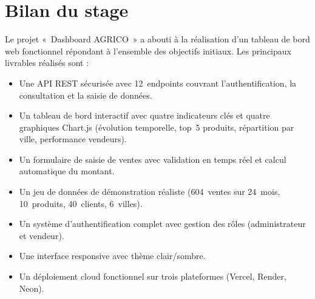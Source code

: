 \documentclass[11pt,a4paper]{report}
\begin{document}
\section{Bilan du stage}
Le projet «~Dashboard AGRICO~» a abouti à la réalisation d'un tableau de bord web
fonctionnel répondant à l'ensemble des objectifs initiaux. Les principaux
livrables réalisés sont :
\begin{itemize}
  \item Une API REST sécurisée avec 12~endpoints couvrant l'authentification, la
        consultation et la saisie de données.
  \item Un tableau de bord interactif avec quatre indicateurs clés et quatre
        graphiques Chart.js (évolution temporelle, top~5 produits, répartition
        par ville, performance vendeurs).
  \item Un formulaire de saisie de ventes avec validation en temps réel et calcul
        automatique du montant.
  \item Un jeu de données de démonstration réaliste (604~ventes sur 24~mois,
        10~produits, 40~clients, 6~villes).
  \item Un système d'authentification complet avec gestion des rôles
        (administrateur et vendeur).
  \item Une interface responsive avec thème clair/sombre.
  \item Un déploiement cloud fonctionnel sur trois plateformes (Vercel, Render,
        Neon).
\end{itemize}
\end{document}
